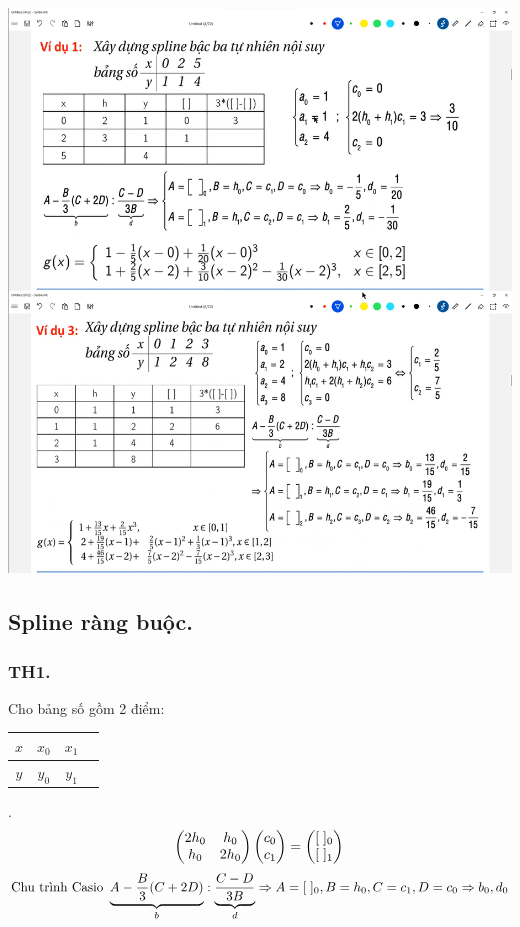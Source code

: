 \documentclass[12pt, a4paper]{report}
\begin{document}
\begin{center}
    \includegraphics[scale = 0.45]{7.png}
\end{center}
\newpage
\subsection{Spline ràng buộc.}
\subsubsection{TH1.} Cho bảng số gồm 2 điểm: \begin{tabular}{c|ccc}
    $x$ & $x_0$ & $x_1$  \\ \hline
    $y$ & $y_0$ & $y_1$   
    \end{tabular}.
\[
    \begin{pmatrix}
        2h_0 & h_0 \\
        h_0 & 2h_0 
    \end{pmatrix}    \begin{pmatrix}
        c_0 \\
        c_1 
    \end{pmatrix} = \begin{pmatrix}
        \lbrack \thickspace \rbrack_0 \\
        \lbrack \thickspace \rbrack_1 
    \end{pmatrix}
\]
\[
    \text{Chu trình Casio } \underbrace{A - \frac{B}{3}(C+2D)}_{b} : \underbrace{\frac{C - D}{3B}}_{d} \Rightarrow  A = \lbrack \thickspace \rbrack_0, B = h_0, C = c_1, D = c_0 \Rightarrow b_0,d_0 
\]
\end{document}
